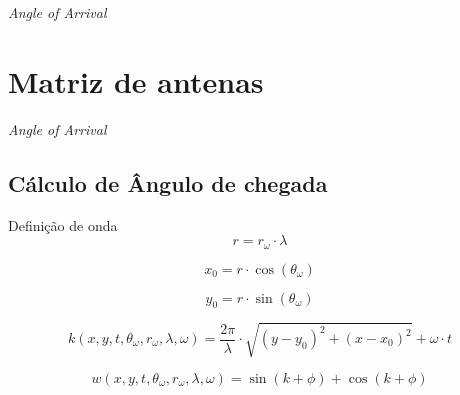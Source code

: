     \begin{frame}{\textit{Angle of Arrival}}
        
    \end{frame}

    \section{Matriz de antenas}
    \begin{frame}{\textit{Angle of Arrival}}
        
    \end{frame}

\subsection{Cálculo de Ângulo de chegada}
    \begin{frame}{Definição de onda}
            \begin{equation*}
                r = r_\omega \cdot \lambda
            \end{equation*}

            \begin{equation*}
                x_0 = r \cdot \cos(\theta_\omega)
            \end{equation*}

            \begin{equation*}
                y_0 = r \cdot \sin(\theta_\omega)
            \end{equation*}

            \begin{equation*}
                k(x, y, t, \theta_\omega, r_\omega, \lambda, \omega) = \frac{2\pi}{\lambda} \cdot \sqrt{(y - y_0)^2+(x - x_0)^2} + \omega \cdot t
            \end{equation*}

            \begin{equation*}
                w(x, y, t, \theta_\omega, r_\omega, \lambda, \omega) = \sin(k + \phi)+ \cos(k + \phi)
            \end{equation*}
    \end{frame}

